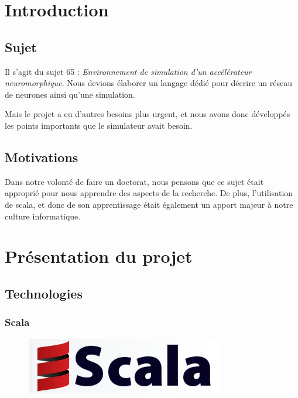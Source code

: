 \documentclass[a4paper,10pt]{article}
\begin{document}
\tableofcontents

\newpage


\section*{Introduction}

\subsection*{Sujet} 
    Il s’agit du sujet 65 : \emph{Environnement de simulation d'un accélérateur neuromorphique}. Nous devions élaborer un langage dédié pour décrire un réseau de neurones ainsi qu’une simulation.

Mais le projet a eu d’autres besoins plus urgent, et nous avons donc développés les points importants que le simulateur avait besoin.

\subsection*{Motivations}
    Dans notre volonté de faire un doctorat, nous pensons que ce sujet était approprié pour nous apprendre des aspects de la recherche. De plus, l’utilisation de scala, et donc de son apprentissage était également un apport majeur à notre culture informatique. 
		

\newpage

\section{Présentation du projet}

\subsection{Technologies}

\subsubsection{Scala} 
\begin{figure}[h!]
\includegraphics[scale=0.15,right]{image/scala.png}
\end{figure}
\end{document}
